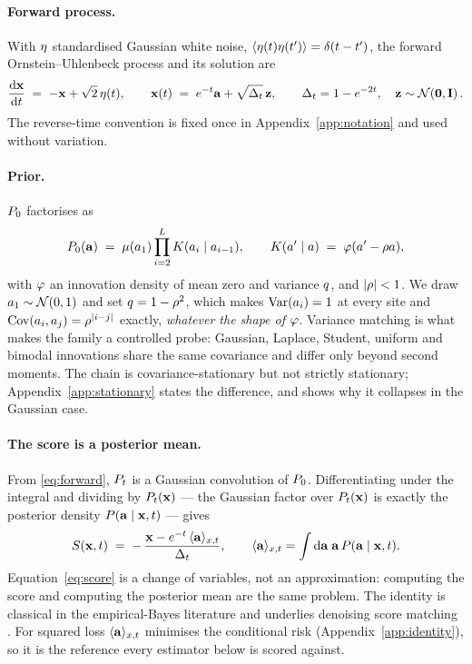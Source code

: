 
\paragraph{Forward process.} With $\mathbf{\eta}$ standardised Gaussian white noise,
$\langle\mathbf{\eta}(t)\mathbf{\eta}(t')\rangle=\delta(t-t')$, the forward Ornstein--Uhlenbeck process and its
solution are
\begin{equation}
\label{eq:forward}
\frac{\mathrm{d}\mathbf{x}}{\mathrm{d}t} \;=\; -\mathbf{x} + \sqrt{2}\,\mathbf{\eta}(t),
\qquad
\mathbf{x}(t) \;=\; e^{-t} \mathbf{a} + \sqrt{\Delta_t}\, \mathbf{z},
\qquad
\Delta_t = 1 - e^{-2t},
\quad \mathbf{z}\sim\mathcal{N}\!\left(\mathbf{0},\mathbf{I}\right).
\end{equation}
The reverse-time convention is fixed once in Appendix~\ref{app:notation} and used without
variation.

\paragraph{Prior.} $P_0$ factorises as
\begin{equation}
\label{eq:prior}
P_0(\mathbf{a}) \;=\; \mu(a_1)\prod_{i=2}^{L} K(a_i \mid a_{i-1}),
\qquad
K(a'\mid a) \;=\; \varphi(a' - \rho a),
\end{equation}
with $\varphi$ an innovation density of mean zero and variance $q$, and $|\rho|<1$. We draw
$a_1\sim\mathcal{N}\!\left(0,1\right)$ and set $q = 1-\rho^2$, which makes $\operatorname{Var}(a_i)=1$ at every site and
$\operatorname{Cov}(a_i,a_j)=\rho^{|i-j|}$ exactly, \emph{whatever the shape of $\varphi$}. Variance matching is
what makes the family a controlled probe: Gaussian, Laplace, Student, uniform and bimodal
innovations share the same covariance and differ only beyond second moments. The chain is
covariance-stationary but not strictly stationary; Appendix~\ref{app:stationary} states the
difference, and shows why it collapses in the Gaussian case.

\paragraph{The score is a posterior mean.} From \eqref{eq:forward}, $P_t$ is a Gaussian
convolution of $P_0$. Differentiating under the integral and dividing by $P_t(\mathbf{x})$ --- the
Gaussian factor over $P_t(\mathbf{x})$ is exactly the posterior density $P(\mathbf{a}\mid \mathbf{x},t)$ --- gives
\begin{equation}
\label{eq:score}
S(\mathbf{x},t) \;=\; -\,\frac{\mathbf{x} - e^{-t}\,\langle \mathbf{a} \rangle_{x,t}}{\Delta_t},
\qquad
\langle \mathbf{a} \rangle_{x,t} = \int \mathrm{d}\mathbf{a}\; \mathbf{a}\, P(\mathbf{a}\mid \mathbf{x},t).
\end{equation}
Equation~\eqref{eq:score} is a change of variables, not an approximation: computing the score and
computing the posterior mean are the same problem. The identity is classical in the
empirical-Bayes literature \citep{robbins1956,miyasawa1961,efron2011} and underlies denoising
score matching \citep{vincent2011,hyvarinen2005}. For squared loss $\langle \mathbf{a} \rangle_{x,t}$ minimises the
conditional risk (Appendix~\ref{app:identity}), so it is the reference every estimator below is
scored against.
